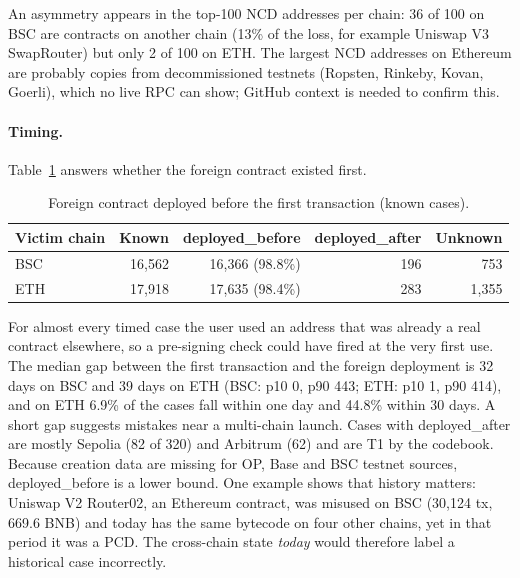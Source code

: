 \documentclass[runningheads]{llncs}
\begin{document}
An asymmetry appears in the top-100 NCD addresses per chain: 36 of 100 on BSC
are contracts on another chain (13\% of the loss, for example Uniswap V3
SwapRouter) but only 2 of 100 on ETH. The largest NCD addresses on Ethereum are probably
copies from decommissioned testnets (Ropsten, Rinkeby, Kovan, Goerli), which no
live RPC can show; GitHub context is needed to confirm this.

\paragraph{Timing.} Table~\ref{tab:timing} answers whether the foreign contract
existed first.
\begin{table}[t]
\caption{Foreign contract deployed before the first transaction (known cases).}
\label{tab:timing}
\centering
\begin{tabular}{@{}lrrrr@{}}
\toprule
Victim chain & Known & deployed\_before & deployed\_after & Unknown\\
\midrule
BSC & 16{,}562 & 16{,}366 (98.8\%) & 196 & 753\\
ETH & 17{,}918 & 17{,}635 (98.4\%) & 283 & 1{,}355\\
\bottomrule
\end{tabular}
\end{table}
For almost every timed case the user used an address that was already a real
contract elsewhere, so a pre-signing check could have fired at the very first
use. The median gap between the first transaction and the foreign deployment is
32 days on BSC and 39 days on ETH (BSC: p10 0, p90 443; ETH: p10 1, p90 414),
and on ETH 6.9\% of the cases fall within one day and 44.8\% within 30 days. A
short gap suggests mistakes near a multi-chain launch. Cases with
deployed\_after are mostly Sepolia (82 of 320) and Arbitrum (62) and are T1 by
the codebook. Because creation data are missing for OP, Base and BSC testnet
sources, deployed\_before is a lower bound. One example shows that history
matters: Uniswap V2 Router02, an Ethereum contract, was misused on BSC (30{,}124 tx,
669.6 BNB) and today has the same bytecode on four other chains, yet in that
period it was a PCD. The cross-chain state \emph{today} would therefore label a
historical case incorrectly.
\end{document}
